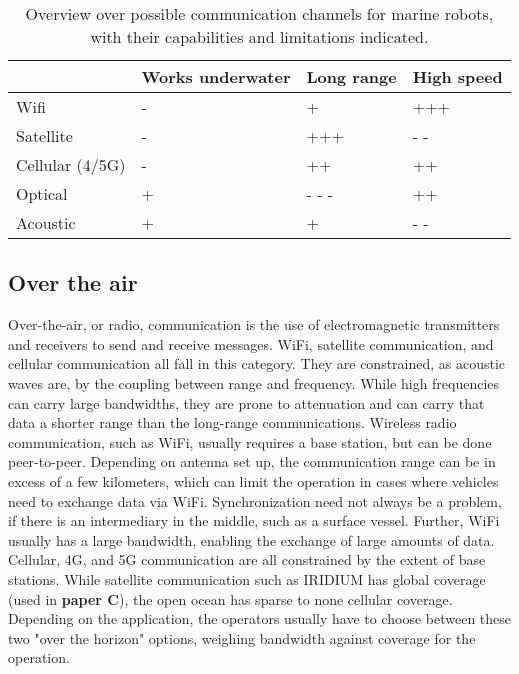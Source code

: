 \begin{table}[]
    \centering
    \begin{tabular}{|l|l|l|l|}
         \hline
         & Works underwater & Long range & High speed\\
       \hline \hline 
        Wifi  & - & + & +++\\
        \hline 
        Satellite & - & +++ & - -\\ 
        \hline 
        Cellular (4/5G) & - & ++ & ++ \\
        \hline 
        Optical & + & - - - & ++ \\ 
        \hline 
        Acoustic & + & + & - - \\
        \hline
    \end{tabular}
    \caption{Overview over possible communication channels for marine robots, with their capabilities and limitations indicated.}
    \label{tab:communication}
\end{table}

\subsection{Over the air}
Over-the-air, or radio, communication is the use of electromagnetic transmitters and receivers to send and receive messages. WiFi, satellite communication, and cellular communication all fall in this category. They are constrained, as acoustic waves are, by the coupling between range and frequency. While high frequencies can carry large bandwidths, they are prone to attenuation and can carry that data a shorter range than the long-range communications. Wireless radio communication, such as WiFi, usually requires a base station, but can be done peer-to-peer. Depending on antenna set up, the communication range can be in excess of a few kilometers, which can limit the operation in cases where vehicles need to exchange data via WiFi\cite{kemna2018multi}. Synchronization need not always be a problem, if there is an intermediary in the middle, such as a surface vessel. Further, WiFi usually has a large bandwidth, enabling the exchange of large amounts of data. Cellular, 4G, and 5G communication are all constrained by the extent of base stations. While satellite communication such as IRIDIUM\textsuperscript{\textregistered}\cite{maine1995overview,pratt1999operational} has global coverage (used in \textbf{paper C}), the open ocean has sparse to none cellular coverage. Depending on the application, the operators usually have to choose between these two "over the horizon" options, weighing bandwidth against coverage for the operation. 

